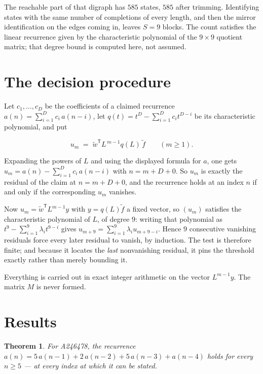\documentclass[11pt]{article}
\newtheorem{theorem}{Theorem}
\theoremstyle{definition}
\begin{document}
The reachable part of that digraph has $585$ states, $585$ after trimming. Identifying states with the same number of completions of every length, and then the mirror identification on the edges coming in, leaves $S = 9$ blocks. The count satisfies the linear recurrence given by the characteristic polynomial of the $9\times9$ quotient matrix; that degree bound is computed here, not assumed.

\section{The decision procedure}

Let $c_1,\dots,c_D$ be the coefficients of a claimed recurrence $a(n) = \sum_{i=1}^{D} c_i\,a(n-i)$, let $q(t) = t^{D} - \sum_{i=1}^{D} c_i t^{D-i}$ be its characteristic polynomial, and put

\[u_m \;=\; \tilde w^{\mathsf T} L^{\,m-1} q(L)\,\tilde f \qquad (m \ge 1).\]

Expanding the powers of $L$ and using the displayed formula for $a$, one gets $u_m = a(n) - \sum_{i=1}^{D} c_i\,a(n-i)$ with $n = m + D + 0$. So $u_m$ is exactly the residual of the claim at $n = m + D + 0$, and the recurrence holds at an index $n$ if and only if the corresponding $u_m$ vanishes.

Now $u_m = \tilde w^{\mathsf T} L^{m-1} y$ with $y = q(L)\tilde f$ a fixed vector, so $(u_m)$ satisfies the characteristic polynomial of $L$, of degree $9$: writing that polynomial as $t^{9} - \sum_{i=1}^{9} \lambda_i t^{9-i}$ gives $u_{m+9} = \sum_{i=1}^{9} \lambda_i u_{m+9-i}$. Hence $9$ consecutive vanishing residuals force every later residual to vanish, by induction. The test is therefore finite; and because it locates the {\itshape last} nonvanishing residual, it pins the threshold exactly rather than merely bounding it.

Everything is carried out in exact integer arithmetic on the vector $L^{m-1}y$. The matrix $M$ is never formed.

\section{Results}

\begin{theorem} For A246478, the recurrence $a(n) = 5\,a(n-1) + 2\,a(n-2) + 5\,a(n-3) + a(n-4)$ holds for every $n \ge 5$ --- at every index at which it can be stated.\end{theorem}
\end{document}
